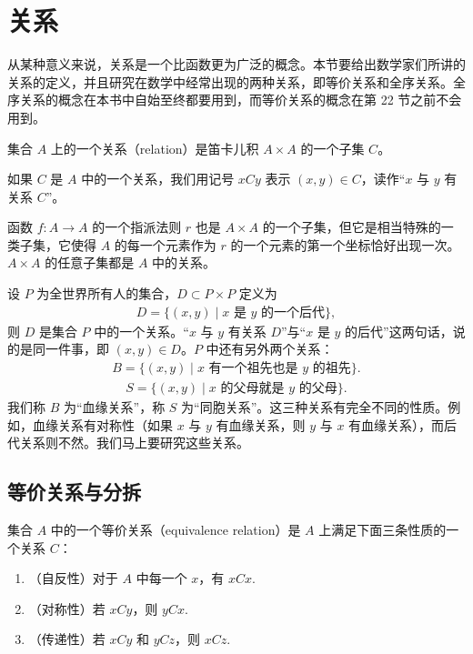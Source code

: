 \documentclass[../../main.tex]{subfiles}
\begin{document}
\section{关系}\label{section:ch01-关系}

从某种意义来说，关系是一个比函数更为广泛的概念。本节要给出数学家们所讲的关系的定义，并且研究在数学中经常出现的两种关系，即等价关系和全序关系。全序关系的概念在本书中自始至终都要用到，而等价关系的概念在第 22 节之前不会用到。

\begin{definition}[关系]\label{definition:ch01-关系}
集合 $A$ 上的一个关系（relation）是笛卡儿积 $A \times A$ 的一个子集 $C$。
\end{definition}

如果 $C$ 是 $A$ 中的一个关系，我们用记号 $xCy$ 表示 $(x, y) \in C$，读作“$x$ 与 $y$ 有关系 $C$”。

函数 $f: A \longrightarrow A$ 的一个指派法则 $r$ 也是 $A \times A$ 的一个子集，但它是相当特殊的一类子集，它使得 $A$ 的每一个元素作为 $r$ 的一个元素的第一个坐标恰好出现一次。$A \times A$ 的任意子集都是 $A$ 中的关系。

\begin{example}\label{example:ch01-人物关系}
设 $P$ 为全世界所有人的集合，$D \subset P \times P$ 定义为
\begin{align*}
D = \{(x, y) \mid x \text{ 是 } y \text{ 的一个后代}\},
\end{align*}
则 $D$ 是集合 $P$ 中的一个关系。“$x$ 与 $y$ 有关系 $D$”与“$x$ 是 $y$ 的后代”这两句话，说的是同一件事，即 $(x, y) \in D$。$P$ 中还有另外两个关系：
\begin{align*}
B = \{(x, y) \mid x \text{ 有一个祖先也是 } y \text{ 的祖先}\}.
\end{align*}
\begin{align*}
S = \{(x, y) \mid x \text{ 的父母就是 } y \text{ 的父母}\}.
\end{align*}
我们称 $B$ 为“血缘关系”，称 $S$ 为“同胞关系”。这三种关系有完全不同的性质。例如，血缘关系有对称性（如果 $x$ 与 $y$ 有血缘关系，则 $y$ 与 $x$ 有血缘关系），而后代关系则不然。我们马上要研究这些关系。
\end{example}

\subsection*{等价关系与分拆}

集合 $A$ 中的一个等价关系（equivalence relation）是 $A$ 上满足下面三条性质的一个关系 $C$：
\begin{enumerate}[(1)]
\item（自反性）对于 $A$ 中每一个 $x$，有 $xCx$.
\item（对称性）若 $xCy$，则 $yCx$.
\item（传递性）若 $xCy$ 和 $yCz$，则 $xCz$.
\end{enumerate}
\end{document}
